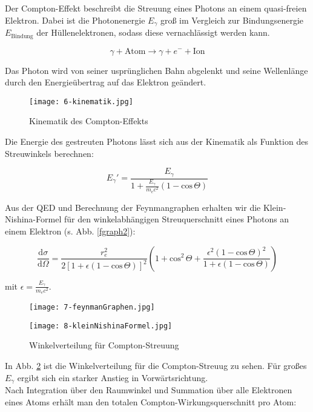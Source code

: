 Der Compton-Effekt beschreibt die Streuung eines Photons an einem quasi-freien Elektron. Dabei ist
die Photonenergie $E_\gamma$ groß im Vergleich zur Bindungsenergie $E_{\text{Bindung}}$ der
Hüllenelektronen, sodass diese vernachlässigt werden kann.

\[ \gamma + \text{Atom} \longrightarrow \gamma + e^- +\text{Ion}\]

Das Photon wird von seiner usprünglichen Bahn abgelenkt und seine Wellenlänge durch den
Energieübertrag auf das Elektron geändert. 

\begin{figure}[H]
	\centering
	\texttt{[image: 6-kinematik.jpg]}
	\caption{Kinematik des Compton-Effekts	}
	\label{}
\end{figure}

Die Energie des gestreuten Photons lässt sich aus der Kinematik als Funktion des Streuwinkels
berechnen:

\[ E_\gamma' = \frac{E_\gamma}{1+ \frac{E_\gamma}{m_ec^2}\left(1-\text{cos}\,\Theta\right)} \]

Aus der QED und Berechnung der Feynmangraphen erhalten wir die Klein-Nishina-Formel für den
winkelabhängigen Streuquerschnitt eines Photons an einem Elektron (s. Abb. \ref{fgraph2}):

\[ \frac{\mathrm{d}\sigma}{\mathrm{d}\Omega} = \frac{r_e^2}{2
\left[1+\epsilon\left(1-\text{cos}\,\Theta \right) \right]^2} \left(1+\text{cos}^2\,\Theta +
\frac{\epsilon^2\left(1-\text{cos}\,\Theta \right)^2}{1+\epsilon\left(1- \text{cos}\,\Theta \right)}
\right)
\]

mit $\epsilon = \frac{E_\gamma}{m_ec^2}$.

\begin{figure}[H]
	\centering
	\texttt{[image: 7-feynmanGraphen.jpg]}
\end{figure}

\begin{figure}[H]
	\centering
	\texttt{[image: 8-kleinNishinaFormel.jpg]}
	\caption{Winkelverteilung für Compton-Streuung}
	\label{kleinnishina}
\end{figure}

In Abb. \ref{kleinnishina} ist die Winkelverteilung für die Compton-Streuug zu sehen. Für großes
$E_\gamma$ ergibt sich ein starker Anstieg in Vorwärtsrichtung.
\\
Nach Integration über den Raumwinkel und Summation über alle Elektronen eines Atoms erhält man den
totalen Compton-Wirkungsquerschnitt pro Atom:

